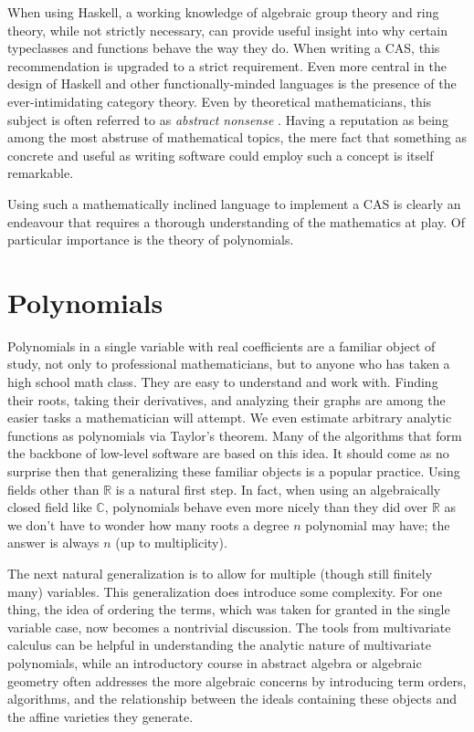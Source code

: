 \documentclass[MS, xcolor=dvipsnames]{wfuthesis}
\def\bC{\mathbb{C}}
\def\bR{\mathbb{R}}
\theoremstyle{definition}
\begin{document}
When using Haskell, a working knowledge of algebraic group theory and ring theory, while not strictly necessary, can provide useful insight into why certain typeclasses and functions behave the way they do. When writing a CAS, this recommendation is upgraded to a strict requirement. Even more central in the design of Haskell and other functionally-minded languages is the presence of the ever-intimidating category theory. Even by theoretical mathematicians, this subject is often referred to as \textit{abstract nonsense} \cite{Saunders1997}. Having a reputation as being among the most abstruse of mathematical topics, the mere fact that something as concrete and useful as writing software could employ such a concept is itself remarkable. \par 
Using such a mathematically inclined language to implement a CAS is clearly an endeavour that requires a thorough understanding of the mathematics at play. Of particular importance is the theory of polynomials. 

\section{Polynomials}
Polynomials in a single variable with real coefficients are a familiar object of study, not only to professional mathematicians, but to anyone who has taken a high school math class. They are easy to understand and work with. Finding their roots, taking their derivatives, and analyzing their graphs are among the easier tasks a mathematician will attempt. We even estimate arbitrary analytic functions as polynomials via Taylor's theorem. Many of the algorithms that form the backbone of low-level software are based on this idea. It should come as no surprise then that generalizing these familiar objects is a popular practice. Using fields other than $\bR$ is a natural first step. In fact, when using an algebraically closed field like $\bC$, polynomials behave even more nicely than they did over $\bR$ as we don't have to wonder how many roots a degree $n$ polynomial may have; the answer is always $n$ (up to multiplicity). \par 
The next natural generalization is to allow for multiple (though still finitely many) variables. This generalization does introduce some complexity. For one thing, the idea of ordering the terms, which was taken for granted in the single variable case, now becomes a nontrivial discussion. The tools from multivariate calculus can be helpful in understanding the analytic nature of multivariate polynomials, while an introductory course in abstract algebra or algebraic geometry often addresses the more algebraic concerns by introducing term orders, algorithms, and the relationship between the ideals containing these objects and the affine varieties they generate. 
\end{document}
